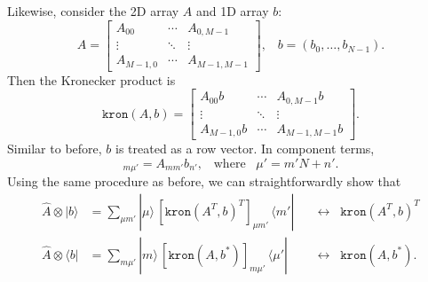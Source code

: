 \documentclass[pra,12pt]{revtex4}
\begin{document}
Likewise, consider the 2D array $A$ and 1D array $b$:
\begin{equation}
  A = \begin{bmatrix}A_{00} & \cdots & A_{0,M-1} \\ \vdots & \ddots & \vdots \\ A_{M-1,0} & \cdots & A_{M-1,M-1} \end{bmatrix}, \;\;\;
  b = (b_0, \dots, b_{N-1}).
\end{equation}
Then the Kronecker product is
\begin{equation}
  \texttt{kron}(A, b) =
  \begin{bmatrix}
    A_{00} b & \cdots & A_{0,M-1} b \\
    \vdots & \ddots & \vdots \\
    A_{M-1,0} b & \cdots & A_{M-1,M-1} b
  \end{bmatrix}.
\end{equation}
Similar to before, $b$ is treated as a row vector.  In component
terms,
\begin{equation}
  [\texttt{kron}(A, b)]_{m\mu'} = A_{mm'} b_{n'}, \;\;\;\mathrm{where}\;\;\;
  \mu' = m'N+n'.
\end{equation}
Using the same procedure as before, we can straightforwardly show that
\begin{align}
  \hat{A} \otimes | b\rangle &=
  \sum_{\mu m'} |\mu\rangle \, [\texttt{kron}(A^T, b)^T]_{\mu m'}
  \, \langle m'| && \leftrightarrow \;\; \texttt{kron}(A^T, b)^T\\
  \hat{A} \otimes \langle b| &=
  \sum_{m\mu'} |m\rangle \, [\texttt{kron}(A, b^*)]_{m\mu'}
  \,  \langle \mu'| && \leftrightarrow \;\; \texttt{kron}(A, b^*).
\end{align}
\end{document}
